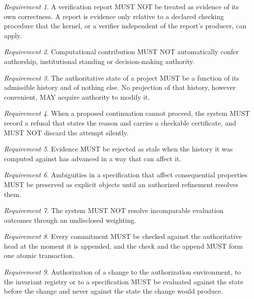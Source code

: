 \documentclass[11pt]{article}
\theoremstyle{remark}
\newtheorem{requirement}{Requirement}
\begin{document}
\begin{requirement}
A verification report MUST NOT be treated as evidence of its own correctness. A report is evidence only relative to a declared checking procedure that the kernel, or a verifier independent of the report's producer, can apply.
\end{requirement}

\begin{requirement}
Computational contribution MUST NOT automatically confer authorship, institutional standing or decision-making authority.
\end{requirement}

\begin{requirement}
The authoritative state of a project MUST be a function of its admissible history and of nothing else. No projection of that history, however convenient, MAY acquire authority to modify it.
\end{requirement}

\begin{requirement}
When a proposed continuation cannot proceed, the system MUST record a refusal that states the reason and carries a checkable certificate, and MUST NOT discard the attempt silently.
\end{requirement}

\begin{requirement}
Evidence MUST be rejected as stale when the history it was computed against has advanced in a way that can affect it.
\end{requirement}

\begin{requirement}
Ambiguities in a specification that affect consequential properties MUST be preserved as explicit objects until an authorized refinement resolves them.
\end{requirement}

\begin{requirement}
The system MUST NOT resolve incomparable evaluation outcomes through an undisclosed weighting.
\end{requirement}

\begin{requirement}
Every commitment MUST be checked against the authoritative head at the moment it is appended, and the check and the append MUST form one atomic transaction.
\end{requirement}

\begin{requirement}
Authorization of a change to the authorization environment, to the invariant registry or to a specification MUST be evaluated against the state before the change and never against the state the change would produce.
\end{requirement}
\end{document}
